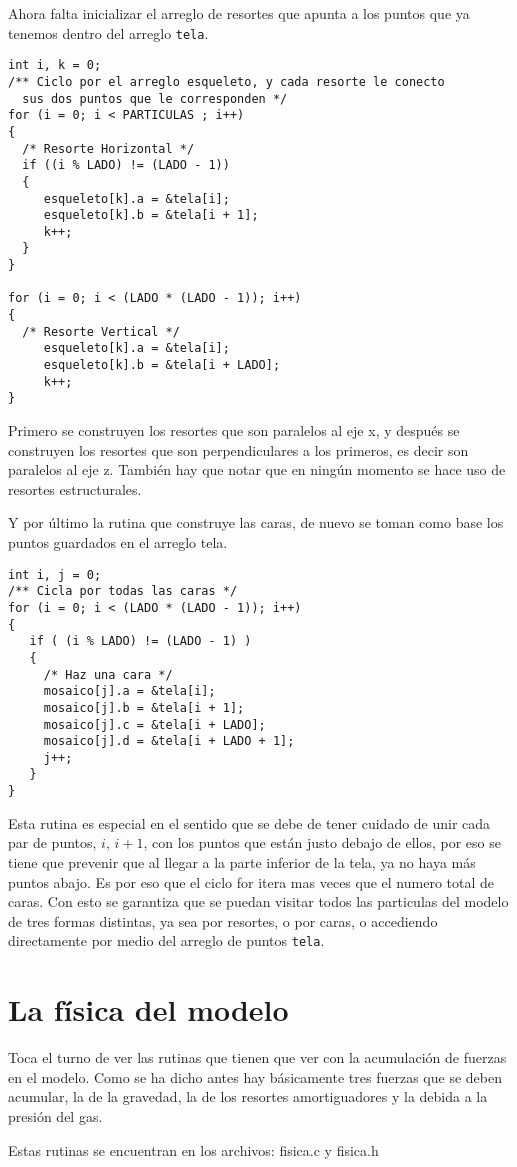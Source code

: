 Ahora falta inicializar el arreglo de resortes que apunta a los puntos que ya tenemos dentro del arreglo \verb|tela|.
\begin{verbatim}
int i, k = 0;
/** Ciclo por el arreglo esqueleto, y cada resorte le conecto 
  sus dos puntos que le corresponden */
for (i = 0; i < PARTICULAS ; i++)
{
  /* Resorte Horizontal */
  if ((i % LADO) != (LADO - 1))
  {
     esqueleto[k].a = &tela[i];
     esqueleto[k].b = &tela[i + 1];
     k++;
  }
}

for (i = 0; i < (LADO * (LADO - 1)); i++)
{
  /* Resorte Vertical */
     esqueleto[k].a = &tela[i];
     esqueleto[k].b = &tela[i + LADO];
     k++;
}
\end{verbatim} 
Primero se construyen los resortes que son paralelos al eje x, y después se construyen los resortes que son perpendiculares a los primeros, es decir son paralelos al eje z. También hay que notar que en ningún momento se hace uso de resortes estructurales.

Y por último la rutina que construye las caras, de nuevo se toman como base los puntos guardados en el arreglo tela.
\begin{verbatim}
int i, j = 0;
/** Cicla por todas las caras */
for (i = 0; i < (LADO * (LADO - 1)); i++)
{
   if ( (i % LADO) != (LADO - 1) )
   {
     /* Haz una cara */
     mosaico[j].a = &tela[i];
     mosaico[j].b = &tela[i + 1];
     mosaico[j].c = &tela[i + LADO];
     mosaico[j].d = &tela[i + LADO + 1];
     j++;
   }
}
\end{verbatim} 
Esta rutina es especial en el sentido que se debe de tener cuidado de unir cada par de puntos, $i$, $i+1$, con los puntos que están justo debajo de ellos, por eso se tiene que prevenir que al llegar a la parte inferior de la tela, ya no haya más puntos abajo. Es por eso que el ciclo for itera mas veces que el numero total de caras. Con esto se garantiza que se puedan visitar todos las particulas del modelo de tres formas distintas, ya sea por resortes, o por caras, o accediendo directamente por medio del arreglo de puntos \verb|tela|.
\section{La física del modelo}
Toca el turno de ver las rutinas que tienen que ver con la acumulación de fuerzas en el modelo. Como se ha dicho antes hay básicamente tres fuerzas que se deben acumular, la de la gravedad, la de los resortes amortiguadores y la debida a la presión del gas.

Estas rutinas se encuentran en los archivos: fisica.c y fisica.h
